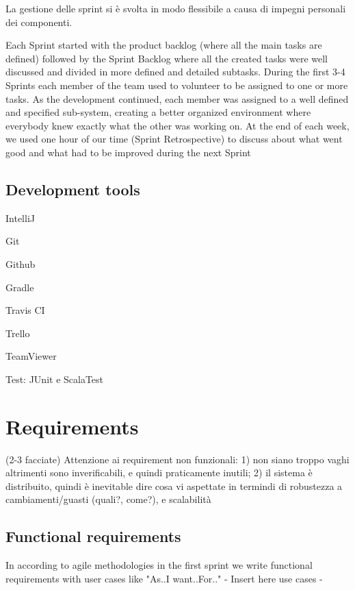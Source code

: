 \documentclass[a4paper,12pt]{report}
\begin{document}
La gestione delle sprint si è svolta in modo flessibile a causa di impegni personali dei componenti.

Each Sprint started with the product backlog (where all the main tasks are defined) followed by the Sprint Backlog where all the created tasks were well discussed and divided in more defined and detailed subtasks. During the first 3-4 Sprints each member of the team used to volunteer to be assigned to one or more tasks. As the development continued, each member was assigned to a well defined and specified sub-system, creating a better organized environment where everybody knew exactly what the other was working on. At the end of each week, we used one hour of our time (Sprint Retrospective) to discuss about what went good and what had to be improved during the next Sprint

\section{Development tools}
IntelliJ

Git

Github

Gradle

Travis CI

Trello

TeamViewer

Test: JUnit e ScalaTest

\chapter{Requirements}
(2-3 facciate)
Attenzione ai requirement non funzionali: 1) non siano troppo vaghi altrimenti sono inverificabili, e quindi praticamente inutili; 2) il sistema è distribuito, quindi è inevitable dire cosa vi aspettate in termindi di robustezza a cambiamenti/guasti (quali?, come?), e scalabilità

\section{Functional requirements}

In according to agile methodologies in the first sprint we write functional requirements with user cases like "As..I want..For.."
- Insert here use cases -\\ 
\end{document}

